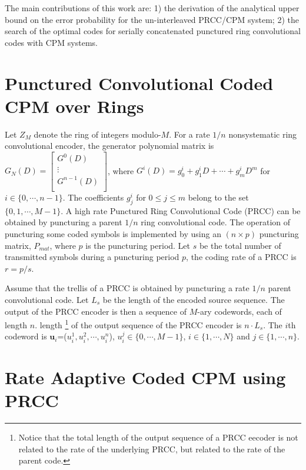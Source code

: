 \documentclass[12pt,twoside,onecolumn,a4paper,english]{IEEEtran2e}
\begin{document}
The main contributions of this work are: 1) the derivation of the analytical upper bound on the
error probability for the un-interleaved PRCC/CPM system; 2) the search of the optimal codes for serially concatenated punctured ring convolutional codes with CPM systems.

\section{Punctured Convolutional Coded CPM over Rings}

Let $Z_M$ denote the ring of integers modulo-$M$. For a
rate $1/n$ nonsystematic ring convolutional encoder, the generator
polynomial matrix is \cite{viterbi} %
$G_N(D)=
\begin{bmatrix}
G^0{(D)}\\
\vdots\\
G^{n-1}{(D)}\\
\end{bmatrix}$,
where $G^i(D)=g_0^i+g_1^iD+\cdots+g_m^iD^m$ for $i
\in \{0,\cdots,n-1\}$. The coefficients $g_j^i$ for $0 \leq j \leq m$
belong to the set $\{0,1,\cdots,M-1\}$. A high rate Punctured Ring
Convolutional Code (PRCC) can be obtained by puncturing a parent
$1/n$ ring convolutional code. The operation of puncturing some
coded symbols is implemented by using an $(n\times p)$ puncturing
matrix, $P_{mat}$, where $p$ is the puncturing period. Let $s$ be
the total number of transmitted symbols during a puncturing period
$p$, the coding rate of a PRCC is $r=p/s$.

Assume that the trellis of a PRCC is obtained by puncturing a rate
$1/n$ parent convolutional code. Let $L_s$ be the length of the
encoded source sequence.
The output of the PRCC encoder is then a sequence of $M$-ary
codewords, each of length $n$. %
length \footnote{Notice that the total length of the output
sequence of a PRCC eecoder is not related to the rate of the
underlying PRCC, but related to the rate of the parent code.}
of
the output sequence of the PRCC encoder is $n\cdot L_s$. The $i$th
codeword is $\textbf{u}_i$=($u_i^1,u_i^2,\cdots,u_i^{n}$),
$u_i^j\in\{0,\cdots,M-1\}$, $i\in\{1,\cdots,N\}$ and
$j\in\{1,\cdots,n\}$.

\section{Rate Adaptive Coded CPM using PRCC}\label{sec:ch6_adaptiveJSCC}
\end{document}
